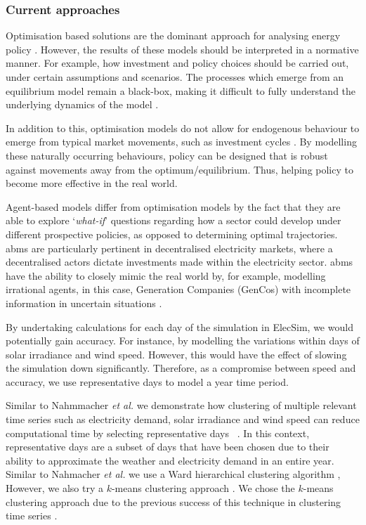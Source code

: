 
\subsubsection{Current approaches}

Optimisation based solutions are the dominant approach for analysing energy policy \cite{Chappin2017}. However, the results of these models should be interpreted in a normative manner. For example, how investment and policy choices should be carried out, under certain assumptions and scenarios. The processes which emerge from an equilibrium model remain a black-box, making it difficult to fully understand the underlying dynamics of the model \cite{Chappin2017}. 



In addition to this, optimisation models do not allow for endogenous behaviour to emerge from typical market movements, such as investment cycles \cite{Chappin2017, Gross2007}. By modelling these naturally occurring behaviours, policy can be designed that is robust against movements away from the optimum/equilibrium. Thus, helping policy to become more effective in the real world. 

Agent-based models differ from optimisation models by the fact that they are able to explore `\textit{what-if}' questions regarding how a sector could develop under different prospective policies, as opposed to determining optimal trajectories. \acrshort{abm}s are particularly pertinent in decentralised electricity markets, where a decentralised actors dictate investments made within the electricity sector. \acrshort{abm}s have the ability to closely mimic the real world by, for example, modelling irrational agents, in this case, Generation Companies (GenCos) with incomplete information in uncertain situations \cite{Ghorbani2014}. 


By undertaking calculations for each day of the simulation in ElecSim, we would potentially gain accuracy. For instance, by modelling the variations within days of solar irradiance and wind speed. However, this would have the effect of slowing the simulation down significantly. Therefore, as a compromise between speed and accuracy, we use representative days to model a year time period. 

Similar to Nahmmacher \textit{et al.} we demonstrate how clustering of multiple relevant time series such as electricity demand, solar irradiance and wind speed can reduce computational time by selecting representative days ~\cite{Nahmmacher2016}. In this context, representative days are a subset of days that have been chosen due to their ability to approximate the weather and electricity demand in an entire year. Similar to Nahmacher \textit{et al.} we use a Ward hierarchical clustering algorithm  \cite{doi:10.1080/01621459.1963.10500845}, However, we also try a $k$-means clustering approach \cite{forgy65}. We chose the $k$-means clustering approach due to the previous success of this technique in clustering time series \cite{Kell2018a}. 



